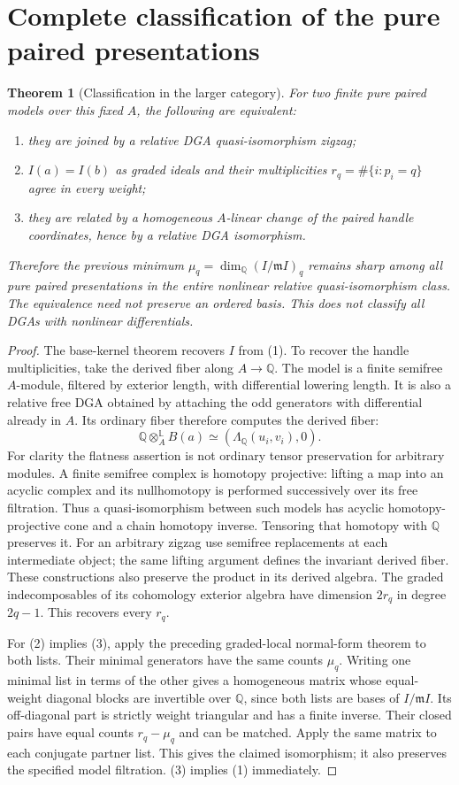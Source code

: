 \documentclass[11pt]{article}
\newtheorem{theorem}{Theorem}
\newcommand{\Q}{\mathbb Q}
\begin{document}
\section{Complete classification of the pure paired presentations}
\begin{theorem}[Classification in the larger category]
For two finite pure paired models over this fixed $A$, the following are
equivalent:
\begin{enumerate}
\item they are joined by a relative DGA quasi-isomorphism zigzag;
\item $I(a)=I(b)$ as graded ideals and their multiplicities
$r_q=\#\{i:p_i=q\}$ agree in every weight;
\item they are related by a homogeneous $A$-linear change of the paired
handle coordinates, hence by a relative DGA isomorphism.
\end{enumerate}
Therefore the previous minimum $\mu_q=\dim_\Q(I/\mathfrak m I)_q$ remains
sharp among all pure paired presentations in the entire nonlinear relative
quasi-isomorphism class. The equivalence need not preserve an ordered
basis. This does not classify all DGAs with nonlinear differentials.
\end{theorem}
\begin{proof}
The base-kernel theorem recovers $I$ from (1). To recover the handle
multiplicities, take the derived fiber along $A\to\Q$. The model is a
finite semifree $A$-module, filtered by exterior length, with differential
lowering length. It is also a relative free DGA obtained by attaching the
odd generators with differential already in $A$. Its ordinary fiber
therefore computes the derived fiber:
\[
 \Q\otimes_A^{\mathbb L}B(a)\simeq
 (\Lambda_\Q(u_i,v_i),0).
\]
For clarity the flatness assertion is not ordinary tensor preservation
for arbitrary modules. A finite semifree complex is homotopy projective:
lifting a map into an acyclic complex and its nullhomotopy is performed
successively over its free filtration. Thus a quasi-isomorphism between
such models has acyclic homotopy-projective cone and a chain homotopy
inverse. Tensoring that homotopy with $\Q$ preserves it. For an arbitrary
zigzag use semifree replacements at each intermediate object; the same
lifting argument defines the invariant derived fiber. These constructions
also preserve the product in its derived algebra. The graded
indecomposables of its cohomology exterior algebra have dimension $2r_q$
in degree $2q-1$. This recovers every $r_q$.

For (2) implies (3), apply the preceding graded-local normal-form theorem
to both lists. Their minimal generators have the same counts $\mu_q$.
Writing one minimal list in terms of the other gives a homogeneous matrix
whose equal-weight diagonal blocks are invertible over $\Q$, since both
lists are bases of $I/\mathfrak m I$. Its off-diagonal part is strictly
weight triangular and has a finite inverse. Their closed pairs have equal
counts $r_q-\mu_q$ and can be matched. Apply the same matrix to each
conjugate partner list. This gives the claimed isomorphism; it also
preserves the specified model filtration. (3) implies (1) immediately.
\end{proof}
\end{document}
